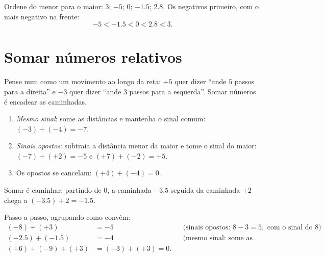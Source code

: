 \begin{example}\label{ex:g7:negatives:compare}
Ordene do menor para o maior: $3$; $-5$; $0$; $-1.5$; $2.8$. Os
negativos primeiro, com o mais negativo na frente:
\[
-5 < -1.5 < 0 < 2.8 < 3 .
\]
\end{example}

\section{Somar números relativos}

Pense num  como um movimento ao longo da reta: $+5$ quer
dizer ``ande $5$ passos para a direita'' e $-3$ quer dizer ``ande $3$
passos para a esquerda''. Somar números é encadear as caminhadas.

\begin{method}\label{met:g7:negatives:add}
\begin{enumerate}
  \item \emph{Mesmo sinal}: some as distâncias e mantenha o sinal
        comum: $(-3) + (-4) = -7$.
  \item \emph{Sinais opostos}: subtraia a distância menor da maior e
        tome o sinal do maior: $(-7) + (+2) = -5$ e
        $(+7) + (-2) = +5$.
  \item Os opostos se cancelam: $(+4) + (-4) = 0$.
\end{enumerate}
\end{method}

\begin{omfigure}

{\small Somar é caminhar: partindo de $0$, a caminhada $-3.5$ seguida
da caminhada $+2$ chega a $(-3.5) + 2 = -1.5$.}
\end{omfigure}

\begin{example}\label{ex:g7:negatives:add}
Passo a passo, agrupando como convém:
\begin{align*}
(-8) + (+3) &= -5 && \text{(sinais opostos: } 8 - 3 = 5,
\text{ com o sinal do } 8)\\
(-2.5) + (-1.5) &= -4 && \text{(mesmo sinal: some as distâncias)}\\
(+6) + (-9) + (+3) &= (-3) + (+3) = 0 .
\end{align*}
\end{example}

